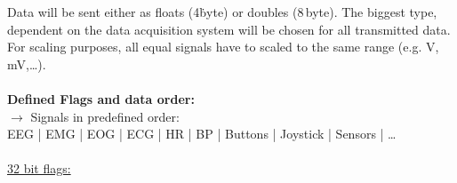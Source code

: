 \documentclass[11pt]{scrartcl}
\begin{document}
  \vspace*{0.5cm}
  Data will be sent either as floats (4\.byte) or doubles (8\,byte). The biggest type, dependent on the data acquisition system will be chosen for all transmitted data.\\
  For scaling purposes, all equal signals have to scaled to the same range (e.g. \textmu V, mV,\dots).\\
  \\
  \textbf{Defined Flags and data order:}\\
  \hspace*{0.3cm} $\rightarrow$ Signals in predefined order:\\
  \hspace*{0.6cm} EEG   |   EMG   |   EOG   |   ECG   |   HR    |   BP    |   Buttons   |   Joystick    |   Sensors   |   \ldots \\
  \\
  \hspace*{0.3cm} \underline{32 bit flags:}
\end{document}
